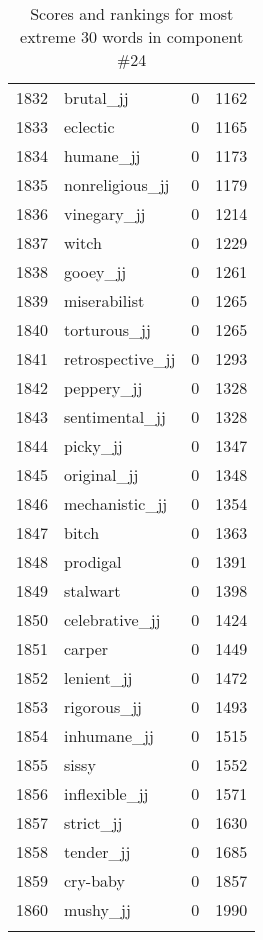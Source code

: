 \begin{longtable}[!htbp]{| rlr@{.}l |}
    1832 & brutal\_jj & 0 & 1162 \\
    1833 & eclectic & 0 & 1165 \\
    1834 & humane\_jj & 0 & 1173 \\
    1835 & nonreligious\_jj & 0 & 1179 \\
    1836 & vinegary\_jj & 0 & 1214 \\
    1837 & witch & 0 & 1229 \\
    1838 & gooey\_jj & 0 & 1261 \\
    1839 & miserabilist & 0 & 1265 \\
    1840 & torturous\_jj & 0 & 1265 \\
    1841 & retrospective\_jj & 0 & 1293 \\
    1842 & peppery\_jj & 0 & 1328 \\
    1843 & sentimental\_jj & 0 & 1328 \\
    1844 & picky\_jj & 0 & 1347 \\
    1845 & original\_jj & 0 & 1348 \\
    1846 & mechanistic\_jj & 0 & 1354 \\
    1847 & bitch & 0 & 1363 \\
    1848 & prodigal & 0 & 1391 \\
    1849 & stalwart & 0 & 1398 \\
    1850 & celebrative\_jj & 0 & 1424 \\
    1851 & carper & 0 & 1449 \\
    1852 & lenient\_jj & 0 & 1472 \\
    1853 & rigorous\_jj & 0 & 1493 \\
    1854 & inhumane\_jj & 0 & 1515 \\
    1855 & sissy & 0 & 1552 \\
    1856 & inflexible\_jj & 0 & 1571 \\
    1857 & strict\_jj & 0 & 1630 \\
    1858 & tender\_jj & 0 & 1685 \\
    1859 & cry-baby & 0 & 1857 \\
    1860 & mushy\_jj & 0 & 1990 \\
    \hline
    \caption{Scores and rankings for most extreme 30 words in component \#24} \\
\end{longtable}
